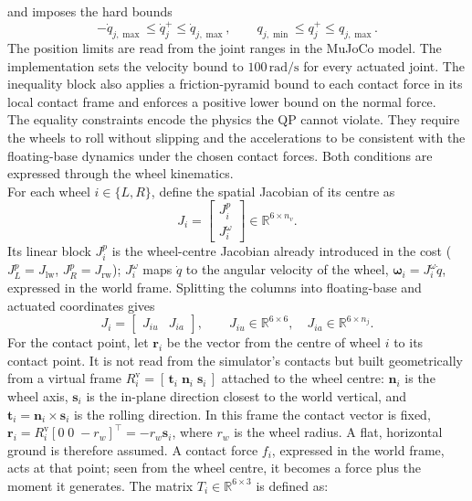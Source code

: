 and imposes the hard bounds
\[
    -\dot{q}_{j,\max}\leq \dot{q}_{j}^{+}\leq \dot{q}_{j,\max},
    \qquad
    q_{j,\min}\leq q_{j}^{+}\leq q_{j,\max}.
\]
The position limits are read from the joint ranges in the MuJoCo model. The
implementation sets the velocity bound to $100\,\mathrm{rad/s}$ for every
actuated joint. The inequality block also applies a friction-pyramid bound to
each contact force in its local contact frame and enforces a positive lower
bound on the normal force.\\
The equality constraints encode the physics the QP cannot violate. They
require the wheels to roll without slipping and the accelerations to be
consistent with the floating-base dynamics under the chosen contact forces.
Both conditions are expressed through the wheel kinematics.\\
For each wheel $i\in\{L,R\}$, define the spatial Jacobian of its centre as
\[
    J_i=\begin{bmatrix} J_i^{p} \\ J_i^{\omega} \end{bmatrix}
    \in\mathbb{R}^{6\times n_v}.
\]
Its linear block $J_i^{p}$ is the wheel-centre Jacobian already introduced in the
cost ($J_L^{p}=J_{\mathrm{lw}}$, $J_R^{p}=J_{\mathrm{rw}}$); $J_i^{\omega}$
maps $\dot{q}$ to the angular velocity of the wheel,
$\boldsymbol{\omega}_i=J_i^{\omega}\dot{q}$, expressed in the world frame.
Splitting the columns into floating-base and actuated coordinates gives
\[
    J_i=\begin{bmatrix} J_{iu} & J_{ia} \end{bmatrix},
    \qquad
    J_{iu}\in\mathbb{R}^{6\times 6},\quad
    J_{ia}\in\mathbb{R}^{6\times n_j}.
\]
For the contact point, let $\mathbf{r}_i$ be the
vector from the centre of wheel $i$ to its contact point. It is not read from
the simulator's contacts but built geometrically from a virtual frame
$R_i^{\mathrm{v}}=[\,\mathbf{t}_i\;\mathbf{n}_i\;\mathbf{s}_i\,]$ attached to
the wheel centre: $\mathbf{n}_i$ is the wheel axis, $\mathbf{s}_i$ is the
in-plane direction closest to the world vertical, and
$\mathbf{t}_i=\mathbf{n}_i\times\mathbf{s}_i$ is the rolling direction. In
this frame the contact vector is fixed,
$\mathbf{r}_i=R_i^{\mathrm{v}}[0\;0\;-r_w]^{\top}=-r_w\mathbf{s}_i$, where
$r_w$ is the wheel radius. A flat, horizontal ground is therefore assumed. A contact force $f_i$, expressed in
the world frame, acts at that point; seen from the wheel centre, it becomes a
force plus the moment it generates. The matrix $T_i\in\mathbb{R}^{6\times 3}$
is defined as:
